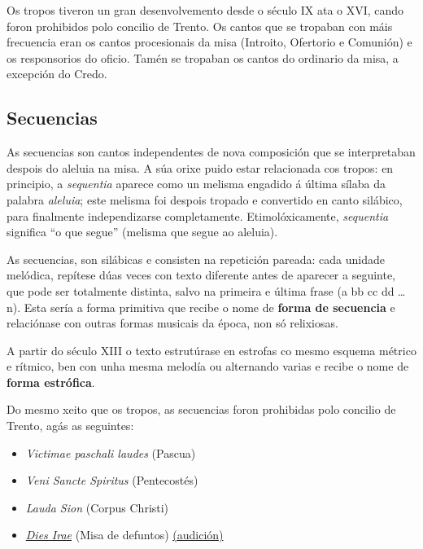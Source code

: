 \documentclass[spanish, a4paper,nobind]{templates/ociamthesis}
\providecommand{\tightlist}{%
  \setlength{\itemsep}{0pt}\setlength{\parskip}{0pt}}
\begin{document}
Os tropos tiveron un gran desenvolvemento desde o século IX ata o XVI, cando foron prohibidos polo concilio de Trento. Os cantos que se tropaban con máis frecuencia eran os cantos procesionais da misa (Introito, Ofertorio e Comunión) e os responsorios do oficio. Tamén se tropaban os cantos do ordinario da misa, a excepción do Credo.

\hypertarget{secuencias}{%
\subsection*{Secuencias}\label{secuencias}}

As secuencias son cantos independentes de nova composición que se interpretaban despois do aleluia na misa. A súa orixe puido estar relacionada cos tropos: en principio, a \emph{sequentia} aparece como un melisma engadido á última sílaba da palabra \emph{aleluia}; este melisma foi despois tropado e convertido en canto silábico, para finalmente independizarse completamente. Etimolóxicamente, \emph{sequentia} significa ``o que segue'' (melisma que segue ao aleluia).

As secuencias, son silábicas e consisten na repetición pareada: cada unidade melódica, repítese dúas veces con texto diferente antes de aparecer a seguinte, que pode ser totalmente distinta, salvo na primeira e última frase (a bb cc dd \ldots{} n). Esta sería a forma primitiva que recibe o nome de \textbf{forma de secuencia} e relaciónase con outras formas musicais da época, non só relixiosas.

A partir do século XIII o texto estrutúrase en estrofas co mesmo esquema métrico e rítmico, ben con unha mesma melodía ou alternando varias e recibe o nome de \textbf{forma estrófica}.

Do mesmo xeito que os tropos, as secuencias foron prohibidas polo concilio de Trento, agás as seguintes:

\begin{itemize}
\tightlist
\item
  \emph{Victimae paschali laudes} (Pascua)
\item
  \emph{Veni Sancte Spiritus} (Pentecostés)
\item
  \emph{Lauda Sion} (Corpus Christi)
\item
  \href{https://gl.wikipedia.org/wiki/Dies_irae}{\emph{Dies Irae}} (Misa de defuntos) \href{https://open.spotify.com/track/7IDZBDMZEkVzqHx3gpQ9yj?si=ca6c04c67bbc4f23}{(audición)}
\end{itemize}
\end{document}
